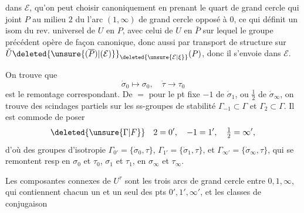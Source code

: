 dans $\mathcal E$, qu'on peut choisir canoniquement en prenant le quart de grand cercle qui joint $P$ au milieu $2$ du  l'arc $(1,\infty)$ de grand cercle opposé à $0$, ce qui définit un isom du rev. universel de $U$ en $P$, avec celui de $U$ en $\bar P$ sur lequel le groupe précédent opère de façon canonique, donc aussi par transport de structure sur $\tilde U\deleted{\unsure{(\overline P)|(\mathcal E)}}_{\deleted{\unsure{\mathcal E|\xi}}}(P)$, donc il s'envoie dans $\mathcal E$.

On trouve que
\[
\dot\sigma_0\mapsto\sigma_0,\quad\dot\tau\to\tau_0
\]
est le remontage correspondant. De $=$ pour le pt fixe $-1$ de $\dot\sigma_1$, ou $\frac12$ de $\dot\sigma_\infty$, on trouve des scindages partiels sur les ss-groupes de  stabilité $\Gamma_{-1}\subset\Gamma$ et $\Gamma_2\subset\Gamma$. Il est commode de poser
\[
\deleted{\unsure{\Gamma|F}}\quad 2=0',\quad -1=1',\quad \tfrac12=\infty',
\]
d'où des groupes d'isotropie $\Gamma_{0'}=\{\dot\sigma_0,\tau\}$, $\Gamma_{1'}=\{\dot\sigma_1,\tau\}$, et $\Gamma_{\infty'}=\{\dot\sigma_\infty,\tau\}$, qui se remontent resp en $\sigma_0$ et $\tau_0$,  $\sigma_1$ et $\tau_1$, en $\sigma_\infty$ et $\tau_\infty$.

Les composantes connexes de $U^\tau$ sont les trois arcs de grand cercle entre $0,1,\infty$, qui contiennent chacun un  et un seul des pts $0',1',\infty'$, et les classes de conjugaison
